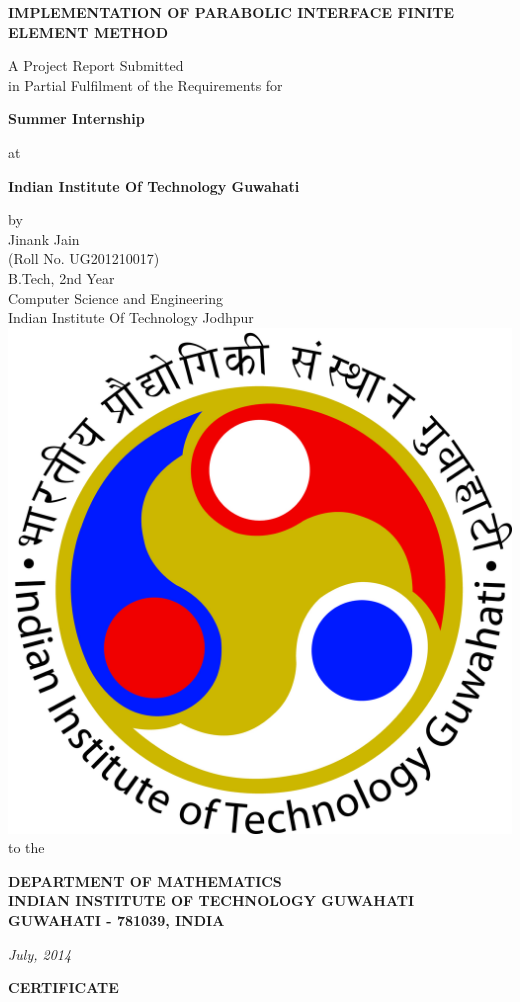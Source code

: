 \documentclass{report}
\begin{document}
\begin{center}
\begin{spacing}{1.5} { \textbf{ {\Large IMPLEMENTATION OF PARABOLIC INTERFACE FINITE ELEMENT METHOD  \bigskip } } }
\end{spacing}
\bigskip \bigskip \bigskip \bigskip \bigskip A Project Report Submitted \\ in Partial Fulfilment of the Requirements for\\ \begin{spacing}{1.5} {\textbf{ \Large Summer Internship}}\end{spacing}
at \\ \begin{spacing}{1.5} {\textbf{ \Large Indian Institute Of Technology Guwahati \linebreak[5] }}
\end{spacing}
\bigskip\bigskip\bigskip\bigskip
by\\ Jinank Jain\\ (Roll No. UG201210017)\\ B.Tech, 2nd Year\\Computer Science and Engineering\\ Indian Institute Of Technology Jodhpur\\ \bigskip \bigskip
\includegraphics[scale=0.07]{iitg}\\ \bigskip to the\\ 
 \begin{spacing}{1.4} {\textbf{ \large DEPARTMENT OF MATHEMATICS \\ INDIAN INSTITUTE OF TECHNOLOGY GUWAHATI \\ GUWAHATI - 781039, INDIA\\ \bigskip}}\end{spacing}
 \textsl{July, 2014}
 
 \newpage
 {\textbf{ \Large CERTIFICATE\\ \bigskip}}
 \end{center}
 
\end{document}
